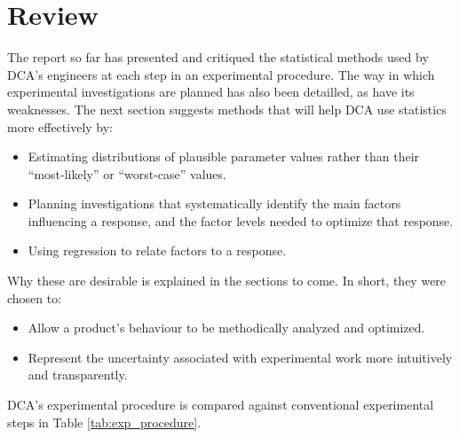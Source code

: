 \documentclass[11pt,a4paper,article]{memoir} %
\begin{document}
\section{Review}
The report so far has presented and critiqued the statistical methods used by DCA's engineers at each step in an experimental procedure. The way in which experimental investigations are planned has also been detailled, as have its weaknesses. The next section suggests methods that will help DCA use statistics more effectively by:
\begin{itemize}
\item Estimating distributions of plausible parameter values rather than their ``most-likely'' or ``worst-case'' values.
\item Planning investigations that systematically identify the main factors influencing a response, and the factor levels needed to optimize that response.
\item Using regression to relate factors to a response.
\end{itemize}
Why these are desirable is explained in the sections to come. In short, they were chosen to:
\begin{itemize}
\item Allow a product's behaviour to be methodically analyzed and optimized.
\item Represent the uncertainty associated with experimental work more intuitively and transparently.
\end{itemize}
DCA's experimental procedure is compared against conventional experimental steps in Table \ref{tab:exp_procedure}.
\end{document}
